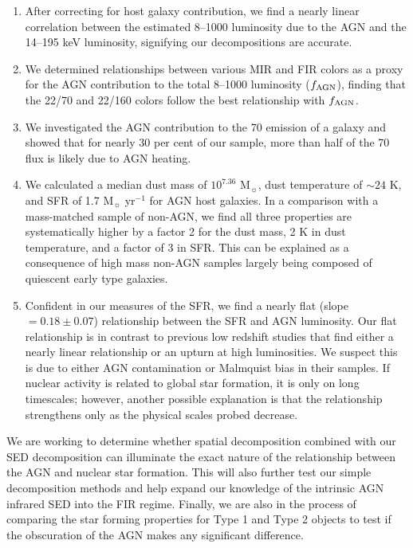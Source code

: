 \documentclass[fleqn, usenatbib]{mnras}
\newcommand{\msun}{M$_{\sun}$}
\begin{document}
\begin{enumerate}
\item After correcting for host galaxy contribution, we find a nearly linear correlation between the estimated 8--1000 \micron{} luminosity due to the AGN and the 14--195 keV luminosity, signifying our decompositions are accurate.

\item We determined relationships between various MIR and FIR colors as a proxy for the AGN contribution to the total 8--1000 \micron{} luminosity ($f_{\rm AGN}$), finding that the 22/70 and 22/160 colors follow the best relationship with $f_{\rm AGN}$. 

\item We investigated the AGN contribution to the 70 \micron{} emission of a galaxy and showed that for nearly 30 per cent of our sample, more than half of the 70 \micron{} flux is likely due to AGN heating.

\item We calculated a median dust mass of $10^{7.36}$ \msun{}, dust temperature of $\sim 24$ K, and SFR of 1.7 \msun{} yr$^{-1}$ for AGN host galaxies. In a comparison with a mass-matched sample of non-AGN, we find all three properties are systematically higher by a factor 2 for the dust mass, 2 K in dust temperature, and a factor of 3 in SFR. This can be explained as a consequence of high mass non-AGN samples largely being composed of quiescent early type galaxies.

\item Confident in our measures of the SFR, we find a nearly flat (slope $= 0.18\pm0.07$) relationship between the SFR and AGN luminosity. Our flat relationship is in contrast to previous low redshift studies that find either a nearly linear relationship or an upturn at high luminosities. We suspect this is due to either AGN contamination or Malmquist bias in their samples. If nuclear activity is related to global star formation, it is only on long timescales; however, another possible explanation is that the relationship strengthens only as the physical scales probed decrease.
\end{enumerate}

We are working to determine whether spatial decomposition combined with our SED decomposition can illuminate the exact nature of the relationship between the AGN and nuclear star formation. This will also further test our simple decomposition methods and help expand our knowledge of the intrinsic AGN infrared SED into the FIR regime. Finally, we are also in the process of comparing the star forming properties for Type 1 and Type 2 objects to test if the obscuration of the AGN makes any significant difference.
\end{document}
